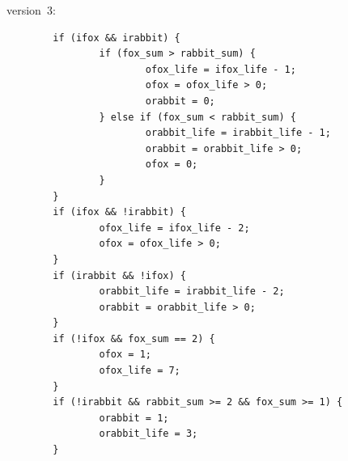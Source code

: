 \large
{} version~3:
\normalsize

\footnotesize
\begin{verbatim}
        if (ifox && irabbit) {
                if (fox_sum > rabbit_sum) {
                        ofox_life = ifox_life - 1;
                        ofox = ofox_life > 0;
                        orabbit = 0;
                } else if (fox_sum < rabbit_sum) {
                        orabbit_life = irabbit_life - 1;
                        orabbit = orabbit_life > 0;
                        ofox = 0;
                }
        }
        if (ifox && !irabbit) {
                ofox_life = ifox_life - 2;
                ofox = ofox_life > 0;
        }
        if (irabbit && !ifox) {
                orabbit_life = irabbit_life - 2;
                orabbit = orabbit_life > 0;
        }
        if (!ifox && fox_sum == 2) {
                ofox = 1;
                ofox_life = 7;
        }
        if (!irabbit && rabbit_sum >= 2 && fox_sum >= 1) {
                orabbit = 1;
                orabbit_life = 3;
        }
\end{verbatim}
\normalsize

